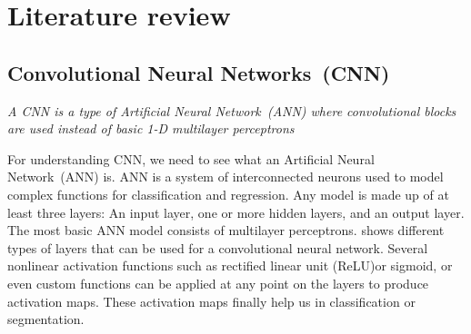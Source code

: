 \chapter{Literature review}\label{chapt:lit}
\section{Convolutional Neural Networks~(CNN)}
\textit{A CNN is a type of Artificial Neural Network~(ANN) where convolutional blocks are used instead of basic 1-D multilayer perceptrons}

For understanding CNN, we need to see what an Artificial Neural Network~(ANN) is. ANN is a system of interconnected neurons used to model complex functions for classification and regression. Any model is made up of at least three layers: An input layer, one or more hidden layers, and an output layer. The most basic ANN model consists of multilayer perceptrons.  shows different types of layers that can be used for a convolutional neural network. Several nonlinear activation functions such as rectified linear unit (ReLU)or sigmoid, or even custom functions can be applied at any point on the layers to produce activation maps. These activation maps finally help us in classification or segmentation.

